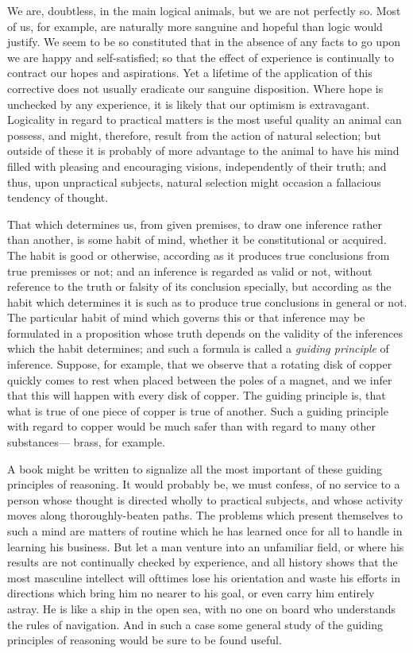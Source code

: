 \documentclass[]{article}
\begin{document}
We are, doubtless, in the main logical animals, but we are not perfectly so. Most of us, for example, are naturally more sanguine and hopeful than logic would justify. We seem to be so constituted that in the absence of any facts to go upon we are happy and self-satisfied; so that the effect of experience is continually to contract our hopes and aspirations. Yet a lifetime of the application of this corrective does not usually eradicate our sanguine disposition. Where hope is unchecked by any experience, it is likely that our optimism is extravagant. Logicality in regard to practical matters is the most useful quality an animal can possess, and might, therefore, result from the action of natural selection; but outside of these it is probably of more advantage to the animal to have his mind filled with pleasing and encouraging visions, independently of their truth; and thus, upon unpractical subjects, natural selection might occasion a fallacious tendency of thought.


That which determines us, from given premises, to draw one inference rather than another, is some habit of mind, whether it be constitutional or acquired. The habit is good or otherwise, according as it produces true conclusions from true premisses or not; and an inference is regarded as valid or not, without reference to the truth or falsity of its conclusion specially, but according as the habit which determines it is such as to produce true conclusions in general or not. The particular habit of mind which governs this or that inference may be formulated in a proposition whose truth depends on the validity of the inferences which the habit determines; and such a formula is called a \emph{guiding principle} of inference. Suppose, for example, that we observe that a rotating disk of copper quickly comes to rest when placed between the poles of a magnet, and we infer that this will happen with every disk of copper. The guiding principle is, that what is true of one piece of copper is true of another. Such a guiding principle with regard to copper would be much safer than with regard to many other substances--- brass, for example.


A book might be written to signalize all the most important of these guiding principles of reasoning. It would probably be, we must confess, of no service to a person whose thought is directed wholly to practical subjects, and whose activity moves along thoroughly-beaten paths. The problems which present themselves to such a mind are matters of routine which he has learned once for all to handle in learning his business. But let a man venture into an unfamiliar field, or where his results are not continually checked by experience, and all history shows that the most masculine intellect will ofttimes lose his orientation and waste his efforts in directions which bring him no nearer to his goal, or even carry him entirely astray. He is like a ship in the open sea, with no one on board who understands the rules of navigation. And in such a case some general study of the guiding principles of reasoning would be sure to be found useful.
\end{document}
